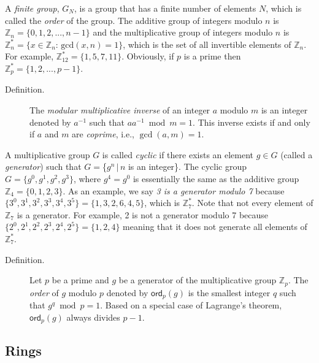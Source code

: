 \documentclass[11pt]{article}
\theoremstyle{plain}
\begin{document}
A \emph{finite group}, $G_{N}$, is a group that has a finite number
of elements $N$, which is called the \emph{order} of the group. The
additive group of integers modulo $n$ is $\mathbb{Z}_{n}=\{0,1,2,...,n-1\}$
and the multiplicative group of integers modulo $n$ is $\mathbb{Z}_{n}^{*}=\{x\in\mathbb{Z}_{n}:\,\text{gcd}(x,n)=1\}$,
which is the set of all invertible elements of $\mathbb{Z}_{n}$.
For example, $\mathbb{Z}_{12}^{*}=\{1,5,7,11\}$. Obviously, if $p$
is a prime then $\mathbb{Z}_{p}^{*}=\{1,2,...,p-1\}$.
\begin{description}
	\item [{Definition.}] \noindent The \emph{modular multiplicative inverse}
	of an integer $a$ modulo $m$ is an integer denoted by $a^{-1}$
	such that $aa^{-1}\bmod{m}=1$. This inverse exists if and only if
	$a$ and $m$ are \emph{coprime}, i.e., $\gcd(a,m)=1$.
\end{description}
A multiplicative group $G$ is called \emph{cyclic} if there exists
an element $g\in G$ (called a \emph{generator}) such that $G=$\{$g^{n}\,|\,n$
is an integer\}. The cyclic group $G=\{g^{0},g^{1},g^{2},g^{3}\}$,
where $g^{4}=g^{0}$ is essentially the same as the additive group
$\mathbb{Z}_{4}=\{0,1,2,3\}$. As an example, we say \emph{3 is a
	generator modulo 7} because $\{3^{0},3^{1},3^{2},3^{3},3^{4},3^{5}\}=\{1,3,2,6,4,5\}$,
which is $\mathbb{Z}_{7}^{*}$. Note that not every element of $\mathbb{Z}_{7}$
is a generator. For example, 2 is not a generator modulo 7 because
$\{2^{0},2^{1},2^{2},2^{3},2^{4},2^{5}\}=\{1,2,4\}$ meaning that
it does not generate all elements of $\mathbb{Z}_{7}^{*}$.
\begin{description}
	\item [{Definition.}] \noindent Let $p$ be a prime and $g$ be a generator
	of the multiplicative group $\mathbb{Z}_{p}$. The \emph{order} of
	$g$ modulo $p$ denoted by $\mathsf{ord}_{p}(g)$ is the smallest
	integer $q$ such that $g^{q}\bmod{p}=1$. Based on a special case
	of Lagrange's theorem, $\mathsf{ord}_{p}(g)$ always divides $p-1$.
\end{description}

\subsection{Rings}
\end{document}
